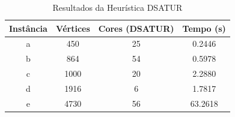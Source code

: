 \begin{table}
\centering
\caption{Resultados da Heurística DSATUR}
\label{tab:resultados_dsatur_1}
\begin{tabular}{cccc}
\toprule
Instância & Vértices & Cores (DSATUR) & Tempo (s) \\
\midrule
a & 450 & 25 & 0.2446 \\
b & 864 & 54 & 0.5978 \\
c & 1000 & 20 & 2.2880 \\
d & 1916 & 6 & 1.7817 \\
e & 4730 & 56 & 63.2618 \\
\bottomrule
\end{tabular}
\end{table}
